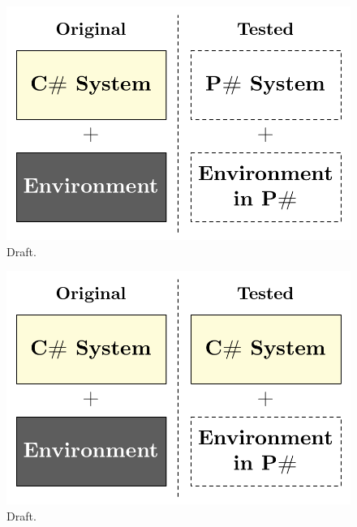 \begin{figure}[t]
\centering
\includegraphics[width=\linewidth]{img/models_old}
\caption{Draft.}
\label{fig:oldapproach}
\end{figure}

\begin{figure}[t]
\centering
\includegraphics[width=\linewidth]{img/models_new}
\caption{Draft.}
\label{fig:newapproach}
\end{figure}

